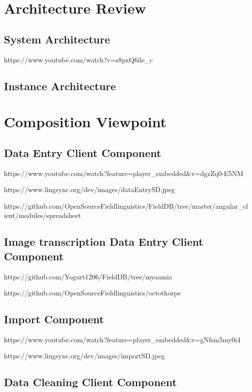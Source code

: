 \documentclass[12pt]{article}
\begin{document}
\section{Architecture Review}
\subsection{System Architecture}

https://www.youtube.com/watch?v=s8pxQ6ile\_c

\subsection{Instance Architecture}

\section{Composition Viewpoint}
\subsection{Data Entry Client Component}

https://www.youtube.com/watch?feature=player\_embedded\&v=dgzZq0-E5NM

https://www.lingsync.org/dev/images/dataEntrySD.jpeg

https://github.com/OpenSourceFieldlinguistics/FieldDB/tree/master/angular\_client/modules/spreadsheet

\subsection{Image transcription Data Entry Client Component}

https://github.com/Yogurt1206/FieldDB/tree/myaamia


https://github.com/OpenSourceFieldlinguistics/octothorpe


\subsection{Import Component}

https://www.youtube.com/watch?feature=player\_embedded\&v=gNfsm5my0i4

https://www.lingsync.org/dev/images/importSD.jpeg

\subsection{Data Cleaning Client Component}
\end{document}
